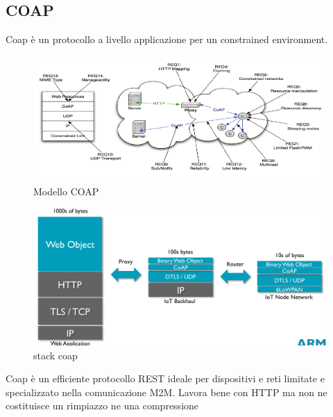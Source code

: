 \documentclass[12pt]{article}
\begin{document}
    \subsection{COAP}
    	Coap è un protocollo a livello applicazione per un constrained environment.
    	\begin{figure}[h!]
    		\centering
    		\includegraphics[scale=0.4]{img/coap.png}
    		\caption{Modello COAP	}
    	\end{figure}
    	\begin{figure}[h!]
    		\centering
    		\includegraphics[scale=0.4]{img/coapstack.png}
    		\caption{stack coap	}
    	\end{figure}
    	Coap è un efficiente protocollo REST ideale per dispositivi e reti limitate e specializzato nella comunicazione M2M. Lavora bene con HTTP ma non ne costituisce un rimpiazzo ne una compressione
    	
    		
    			
    			
    			
    			
    		
	   				
			
			
			
			
			
			
		
		
			
			
			
		
			
\end{document}
